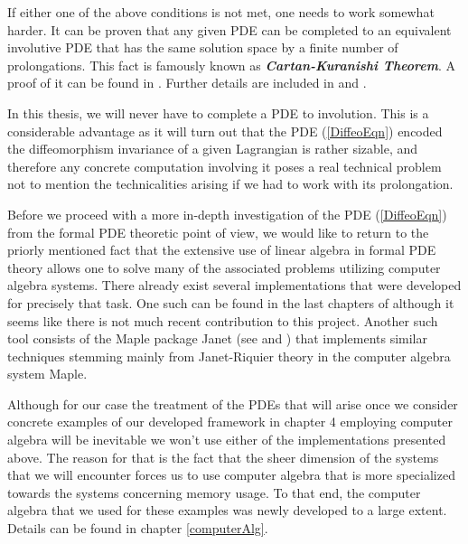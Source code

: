 \documentclass[a4paper,12pt, DIV=14, BCOR=5mm, twoside, headsepline, numbers=noenddot]{scrbook}
\begin{document}
If either one of the above conditions is not met, one needs to work somewhat harder. It can be proven that any given PDE can be completed to an equivalent involutive PDE that has the same solution space by a finite number of prolongations. This fact is famously known as \textbf{\textit{Cartan-Kuranishi Theorem}}. A proof of it can be found in \cite{sweeney1968}. Further details are included in \cite{seiler2009involution} and \cite{seiler1994analysis}.

In this thesis, we will never have to complete a PDE to involution. This is a considerable advantage as it will turn out that the PDE (\ref{DiffeoEqn}) encoded the diffeomorphism invariance of a given Lagrangian is rather sizable, and therefore any concrete computation involving it poses a real technical problem not to mention the technicalities arising if we had to work with its prolongation. 

Before we proceed with a more in-depth investigation of the PDE (\ref{DiffeoEqn}) from the formal PDE theoretic point of view, we would like to return to the priorly mentioned fact that the extensive use of linear algebra in formal PDE theory allows one to solve many of the associated problems utilizing computer algebra systems. There already exist several implementations that were developed for precisely that task. One such can be found in the last chapters of \cite{seiler1994analysis} although it seems like there is not much recent contribution to this project. Another such tool consists of the Maple package Janet (see \cite{Janet2} and \cite{Janet}) that implements similar techniques stemming mainly from Janet-Riquier theory in the computer algebra system Maple. 

Although for our case the treatment of the PDEs that will arise once we consider concrete examples of our developed framework in chapter 4 employing computer algebra will be inevitable we won't use either of the implementations presented above. The reason for that is the fact that the sheer dimension of the systems that we will encounter forces us to use computer algebra that is more specialized towards the systems concerning memory usage. To that end, the computer algebra that we used for these examples was newly developed to a large extent. Details can be found in chapter \ref{computerAlg}.    
\end{document}
